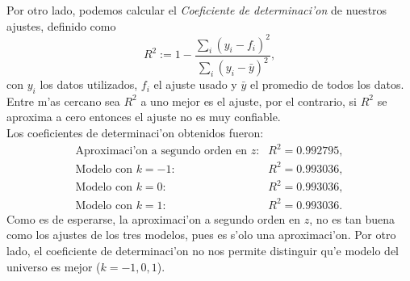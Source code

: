  Por otro lado, podemos calcular el \textit{Coeficiente de determinaci'on} de nuestros ajustes, definido como 
\begin{equation}
 R^2:=1- \frac{\sum_i(y_i-f_i)^2}{\sum_i(y_i- \bar{y})^2},
\end{equation}
con $y_i$ los datos utilizados, $f_i$ el ajuste usado y $\bar{y}$ el promedio de todos los datos. Entre m'as cercano sea $R^2$ a uno
mejor es el ajuste, por el contrario, si $R^2$ se aproxima a cero entonces el ajuste no es muy confiable.\\
Los coeficientes de determinaci'on obtenidos fueron:
\begin{equation}
\begin{array}{rl}
\mbox{Aproximaci'on a segundo orden en $z$:}& R^2 = 0.992795,\\
\mbox{Modelo con $k=-1$:}& R^2 = 0.993036,\\
\mbox{Modelo con $k=0$:} & R^2 = 0.993036, \\
\mbox{Modelo con $k=1$:} & R^2 = 0.993036.
\end{array}
\end{equation}
Como es de esperarse, la aproximaci'on a segundo orden en $z$, no es tan buena como los ajustes de los tres modelos, pues es s'olo una 
aproximaci'on. Por otro lado, el coeficiente de determinaci'on no nos permite distinguir qu'e modelo del universo es mejor ($k=-1,0,1$).\\
 
